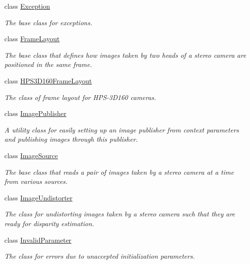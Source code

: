\begin{DoxyCompactItemize}
class \hyperlink{classstereo__ugv_1_1Exception}{Exception}
\begin{DoxyCompactList}\small\item\em The base class for exceptions. \end{DoxyCompactList}\item 
class \hyperlink{classstereo__ugv_1_1FrameLayout}{Frame\+Layout}
\begin{DoxyCompactList}\small\item\em The base class that defines how images taken by two heads of a stereo camera are positioned in the same frame. \end{DoxyCompactList}\item 
class \hyperlink{classstereo__ugv_1_1HPS3D160FrameLayout}{H\+P\+S3\+D160\+Frame\+Layout}
\begin{DoxyCompactList}\small\item\em The class of frame layout for H\+P\+S-\/3\+D160 cameras. \end{DoxyCompactList}\item 
class \hyperlink{classstereo__ugv_1_1ImagePublisher}{Image\+Publisher}
\begin{DoxyCompactList}\small\item\em A utility class for easily setting up an image publisher from context parameters and publishing images through this publisher. \end{DoxyCompactList}\item 
class \hyperlink{classstereo__ugv_1_1ImageSource}{Image\+Source}
\begin{DoxyCompactList}\small\item\em The base class that reads a pair of images taken by a stereo camera at a time from various sources. \end{DoxyCompactList}\item 
class \hyperlink{classstereo__ugv_1_1ImageUndistorter}{Image\+Undistorter}
\begin{DoxyCompactList}\small\item\em The class for undistorting images taken by a stereo camera such that they are ready for disparity estimation. \end{DoxyCompactList}\item 
class \hyperlink{classstereo__ugv_1_1InvalidParameter}{Invalid\+Parameter}
\begin{DoxyCompactList}\small\item\em The class for errors due to unaccepted initialization parameters. \end{DoxyCompactList}\item 

\end{DoxyCompactItemize}

